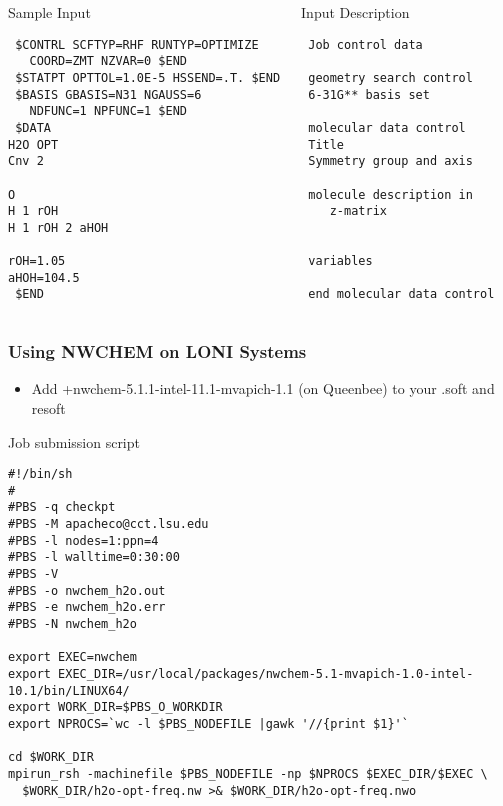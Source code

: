 \documentclass[slidestop,mathserif,compress,xcolor=svgnames]{beamer}
\begin{document}
\begin{frame}[fragile]
\scriptsize{
\begin{columns}
\column{6.5cm}
\begin{block}{Sample Input}
\begin{verbatim}
 $CONTRL SCFTYP=RHF RUNTYP=OPTIMIZE 
   COORD=ZMT NZVAR=0 $END
 $STATPT OPTTOL=1.0E-5 HSSEND=.T. $END
 $BASIS GBASIS=N31 NGAUSS=6 
   NDFUNC=1 NPFUNC=1 $END
 $DATA
H2O OPT 
Cnv 2

O 
H 1 rOH 
H 1 rOH 2 aHOH

rOH=1.05
aHOH=104.5
 $END
\end{verbatim}
\end{block}
\column{5cm}
{\color{tigersblue}
\begin{alertblock}{Input Description}
\begin{verbatim}
 Job control data
   
 geometry search control
 6-31G** basis set  
   
 molecular data control
 Title
 Symmetry group and axis

 molecule description in 
    z-matrix


 variables

 end molecular data control
\end{verbatim}
\end{alertblock}
}
\end{columns}
}
\end{frame}

\begin{frame}[fragile]
\frametitle{\small Using NWCHEM on LONI Systems}
\begin{itemize}
\item Add +nwchem-5.1.1-intel-11.1-mvapich-1.1 (on Queenbee) to your .soft and resoft
\end{itemize}
{\tiny
\begin{exampleblock}{Job submission script}
{\color{white}
\begin{verbatim}
#!/bin/sh
#
#PBS -q checkpt
#PBS -M apacheco@cct.lsu.edu
#PBS -l nodes=1:ppn=4
#PBS -l walltime=0:30:00
#PBS -V
#PBS -o nwchem_h2o.out
#PBS -e nwchem_h2o.err
#PBS -N nwchem_h2o 

export EXEC=nwchem
export EXEC_DIR=/usr/local/packages/nwchem-5.1-mvapich-1.0-intel-10.1/bin/LINUX64/
export WORK_DIR=$PBS_O_WORKDIR
export NPROCS=`wc -l $PBS_NODEFILE |gawk '//{print $1}'` 

cd $WORK_DIR
mpirun_rsh -machinefile $PBS_NODEFILE -np $NPROCS $EXEC_DIR/$EXEC \
  $WORK_DIR/h2o-opt-freq.nw >& $WORK_DIR/h2o-opt-freq.nwo
\end{verbatim}
}
\end{exampleblock}
}
\end{frame}
\end{document}
